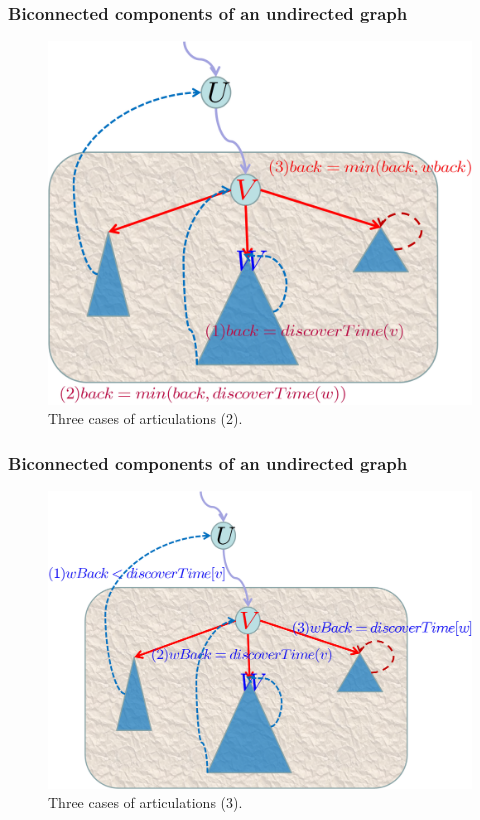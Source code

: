 \begin{frame}
  \frametitle{Biconnected components of an undirected graph}

  \begin{figure}
    \begin{center}
      \includegraphics[scale=0.40]{figure/bfs_dfs/bicon2}
      \caption{{\scriptsize Three cases of articulations (2).}}
      \label{fig:bicon2}
    \end{center}
  \end{figure}

\end{frame}


\begin{frame}
  \frametitle{Biconnected components of an undirected graph}

  \begin{figure}
    \begin{center}
      \includegraphics[scale=0.40]{figure/bfs_dfs/bicon3}
      \caption{{\scriptsize Three cases of articulations (3).}}
      \label{fig:bicon3}
    \end{center}
  \end{figure}

\end{frame}



